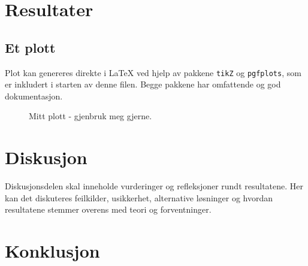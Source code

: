 \documentclass[11pt,a4paper,twocolumn]{article}
\begin{document}
\section{Resultater}
\subsection{Et plott}
Plot kan genereres direkte i \LaTeX{} ved hjelp av pakkene \verb|tikZ| og \verb|pgfplots|, som er inkludert i starten av denne filen. Begge pakkene har omfattende og god dokumentasjon.
% 
\begin{figure}[htb] %
\centering
{}
\caption{Mitt plott - gjenbruk meg gjerne.}
\label{fig:plot}
\end{figure}



\section{Diskusjon}

Diskusjonsdelen skal inneholde vurderinger og refleksjoner rundt resultatene. Her kan det diskuteres feilkilder, usikkerhet, alternative løsninger og hvordan resultatene stemmer overens med teori og forventninger.


\section{Konklusjon}
\end{document}
